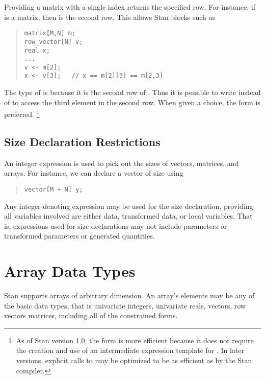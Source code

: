 Providing a matrix with a single index returns the specified row.  For
instance, if  is a matrix, then  is the second row.
This allows Stan blocks such as
%
\begin{quote}
\begin{Verbatim} 
matrix[M,N] m;    
row_vector[N] v;    
real x;
...
v <- m[2];   
x <- v[3];   // x == m[2][3] == m[2,3]
\end{Verbatim}
\end{quote}
% 
The type of  is  because it is the second
row of .  Thus it is possible to write  instead
of  to access the third element in the second row.  When
given a choice, the form  is preferred.%
%
\footnote{As of Stan version 1.0, the form
   is more efficient because it does not require the
  creation and use of an intermediate expression template for
  .  In later versions, explicit calls to 
  may be optimized to be as efficient as  by the Stan
  compiler.\label{array-index-style.footnote}}


\subsection{Size Declaration Restrictions}

An integer expression is used to pick out the sizes of vectors,
matrices, and arrays.  For instance, we can declare a vector of size
 using
%
\begin{quote}
\begin{Verbatim}
vector[M + N] y;
\end{Verbatim}
\end{quote}
%
Any integer-denoting expression may be used for the size declaration,
providing all variables involved are either data, transformed data, or
local variables.  That is, expressions used for size declarations may
not include parameters or transformed parameters or generated
quantities.  

\section{Array Data Types}\label{array-data-types.section}

Stan supports arrays of arbitrary dimension.  An array's elements may
be any of the basic data types, that is univariate integers,
univariate reals, vectors, row vectors matrices, including all of the
constrained forms.

